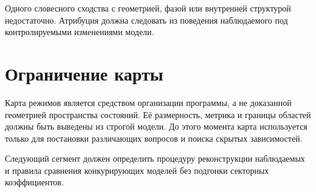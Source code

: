 Одного словесного сходства с геометрией, фазой или внутренней структурой
недостаточно. Атрибуция должна следовать из поведения наблюдаемого под
контролируемыми изменениями модели.

\chapter{Ограничение карты}

Карта режимов является средством организации программы, а не доказанной
геометрией пространства состояний. Её размерность, метрика и границы областей
должны быть выведены из строгой модели. До этого момента карта используется
только для постановки различающих вопросов и поиска скрытых зависимостей.

Следующий сегмент должен определить процедуру реконструкции наблюдаемых и
правила сравнения конкурирующих моделей без подгонки секторных коэффициентов.